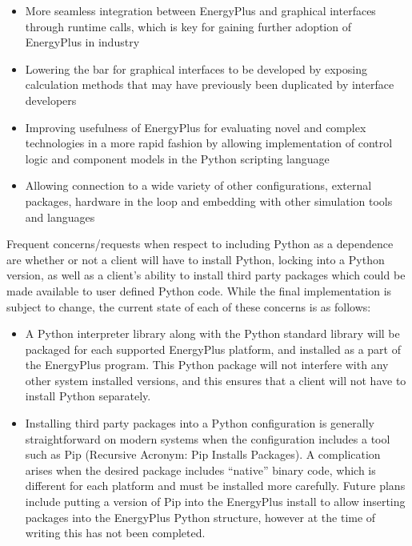\documentclass[5p]{elsarticle}
\begin{document}
\begin{itemize}
 \item More seamless integration between EnergyPlus and graphical interfaces through runtime calls, which is key for gaining further adoption of EnergyPlus in industry
 \item Lowering the bar for graphical interfaces to be developed by exposing calculation methods that may have previously been duplicated by interface developers
 \item Improving usefulness of EnergyPlus for evaluating novel and complex technologies in a more rapid fashion by allowing implementation of control logic and component models in the Python scripting language
 \item Allowing connection to a wide variety of other configurations, external packages, hardware in the loop and embedding with other simulation tools and languages
\end{itemize}

Frequent concerns/requests when respect to including Python as a dependence are whether or not a client will have to install Python, locking into a Python version, as well as a client’s ability to install third party packages which could be made available to user defined Python code.  While the final implementation is subject to change, the current state of each of these concerns is as follows:

\begin{itemize}
 \item A Python interpreter library along with the Python standard library will be packaged for each supported EnergyPlus platform, and installed as a part of the EnergyPlus program.  This Python package will not interfere with any other system installed versions, and this ensures that a client will not have to install Python separately.
 \item Installing third party packages into a Python configuration is generally straightforward on modern systems when the configuration includes a tool such as Pip (Recursive Acronym: Pip Installs Packages).  A complication arises when the desired package includes “native” binary code, which is different for each platform and must be installed more carefully.  Future plans include putting a version of Pip into the EnergyPlus install to allow inserting packages into the EnergyPlus Python structure, however at the time of writing this has not been completed.
\end{itemize}

 
 
\end{document}
